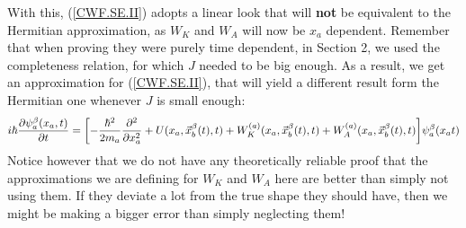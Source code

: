 \documentclass[11pt, a4paper]{article} %
\begin{document}
With this, (\ref{CWF.SE.II}) adopts a linear look that will {\bf not} be equivalent to the Hermitian approximation, as $W_K$ and $W_A$ will now be $x_a$ dependent. Remember that when proving they were purely time dependent, in Section 2, we used the completeness relation, for which $J$ needed to be big enough. As a result, we get an approximation for (\ref{CWF.SE.II}), that will yield a different result form the Hermitian one whenever $J$ is small enough:
$$
i\hbar \pdv{\psi_a^\beta(x_a, t)}{t} = \qty[- \frac{\hbar^2}{2m_a}\pdv[2]{}{x_a} + U(x_a, \vec{x}_b^\beta(t), t)+ W^{(a)}_K(x_a,\vec{x}_b^\beta (t),t) +W^{(a)}_A(x_a,\vec{x}_b^\beta (t),t) ]\psi_a^\beta(x_a t)
$$
Notice however that we do not have any theoretically reliable proof that the approximations we are defining for $W_K$ and $W_A$ here are better than simply not using them. If they deviate a lot from the true shape they should have, then we might be making a bigger error than simply neglecting them!
\end{document}
